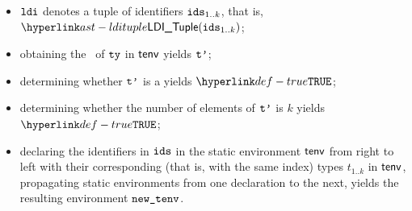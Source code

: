 \ProseParagraph
\AllApply
\begin{itemize}
  \item $\ldi$ denotes a tuple of identifiers $\vids_{1..k}$, that is, $\LDITuple(\vids_{1..k})$;
  \item obtaining the \underlyingtype\ of $\tty$ in $\tenv$ yields $\vtp$\ProseOrTypeError;
  \item determining whether $\vtp$ is a \tupletypeterm{} yields $\True$\ProseOrTypeError;
  \item determining whether the number of elements of $\vtp$ is $k$ yields $\True$\ProseOrTypeError;
  \item declaring the identifiers in $\vids$ in the static environment $\tenv$ from right to left with their corresponding
        (that is, with the same index) types $t_{1..k}$ in $\tenv$,
        propagating static environments from one declaration to the next,
        yields the resulting environment $\newtenv$\ProseOrTypeError.
\end{itemize}
\FormallyParagraph
\begin{mathpar}
\end{mathpar}

